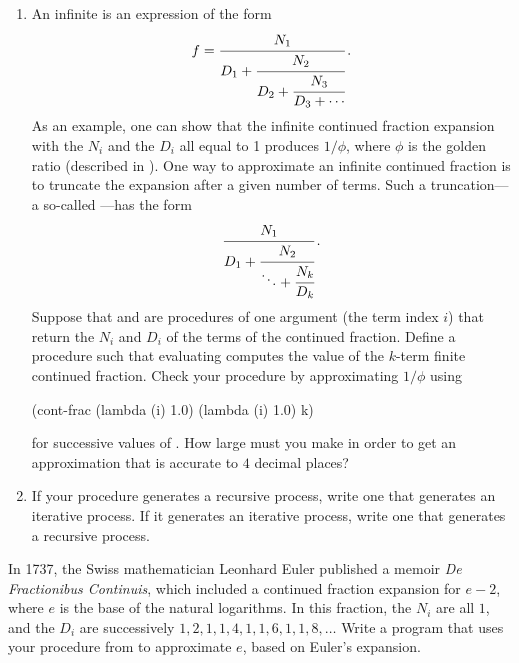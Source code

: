 \begin{exercise}
	\label{Exercise 1.37}
	\begin{enumerate}[label = \alph*., leftmargin = *]

		\item
			An infinite  is an expression of the form
			\[
				f = \cfrac{N_1}{D_1 + \cfrac{N_2}{D_2 + \cfrac{N_3}{D_3 + \dotsb}}} \,.
			\]
			As an example, one can show that the infinite continued fraction expansion with the \( N_i \) and the \( D_i \) all equal to 1 produces \( 1 / ϕ \), where \( ϕ \) is the golden ratio (described in ).
			One way to approximate an infinite continued fraction is to truncate the expansion after a given number of terms.
			Such a truncation---a so-called ---has the form
			\[
				\cfrac{N_1}{D_1 + \cfrac{N_2}{\ddots + \cfrac{N_k}{D_k}}} \,.
			\]
			Suppose that  and  are procedures of one argument (the term index \( i \)) that return the \( N_i \) and \( D_i \) of the terms of the continued fraction.
			Define a procedure  such that evaluating  computes the value of the \( k \)-term finite continued fraction.
			Check your procedure by approximating \( 1 / ϕ \) using
			\begin{scheme}
			  (cont-frac (lambda (i) 1.0)
			             (lambda (i) 1.0)
			             k)
			\end{scheme}
			for successive values of .
			How large must you make  in order to get an approximation that is accurate to \( 4 \) decimal places?

		\item
			If your  procedure generates a recursive process, write one that generates an iterative process.
			If it generates an iterative process, write one that generates a recursive process.

	\end{enumerate}
\end{exercise}



\begin{exercise}
	\label{Exercise 1.38}
	In 1737, the Swiss mathematician Leonhard Euler published a memoir \textit{De Fractionibus Continuis}, which included a continued fraction expansion for \( e - 2 \), where \( e \) is the base of the natural logarithms.
	In this fraction, the \( N_i \) are all \( 1 \), and the \( D_i \) are successively \( 1, 2, 1, 1, 4, 1, 1, 6, 1, 1, 8, \dotsc \)
	Write a program that uses your  procedure from  to approximate \( e \), based on Euler’s expansion.
\end{exercise}



